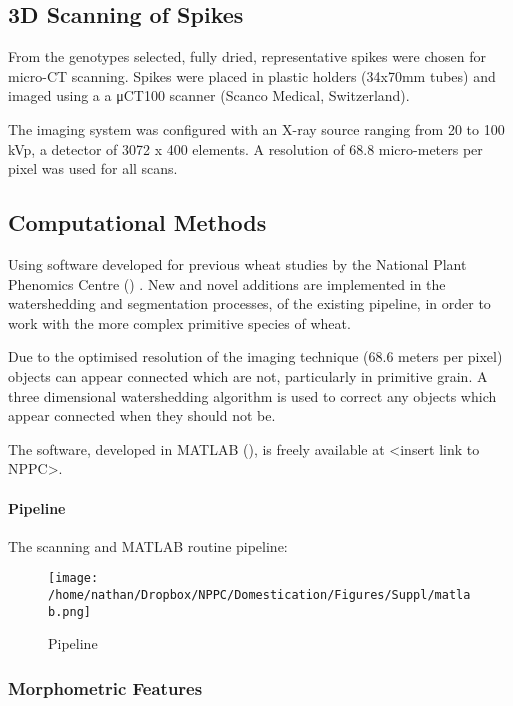 \documentclass[a4paper]{article}
\begin{document}
\subsection{3D Scanning of Spikes}
\label{sec:org3c0aa2e}

From the genotypes selected, fully dried,
representative spikes were chosen for micro-CT scanning.
Spikes were placed in plastic holders (34x70mm tubes) and imaged using a a μCT100 scanner (Scanco Medical, Switzerland).

The imaging system was configured with an X-ray source ranging from 20 to 100 kVp,
a detector of 3072 x 400 elements. A resolution of 68.8 micro-meters per pixel was used for all scans.


\subsection{Computational Methods}
\label{sec:org36dc96c}

Using software developed for previous wheat studies by the National Plant Phenomics Centre (\cite{Hughes2017}) . New and novel additions are implemented in the watershedding and segmentation processes, of the existing pipeline, in order to work with the more complex primitive species of wheat.

Due to the optimised resolution of the imaging technique (68.6\textmu{} meters per pixel) objects can appear connected which are not, particularly in primitive grain. A three dimensional watershedding algorithm is used to correct any objects which appear connected when they should not be.

The software, developed in MATLAB (\cite{MATHWORKS2017}), is freely available at <insert link to NPPC>.

\paragraph{Pipeline}
\label{sec:org3d92b5e}
The scanning and MATLAB routine pipeline:

\begin{figure}[htbp]
\centering
\texttt{[image: /home/nathan/Dropbox/NPPC/Domestication/Figures/Suppl/matlab.png]}
\caption{\label{fig:orgb4dd527}
Pipeline}
\end{figure}

\subsubsection{Morphometric Features}
\label{sec:orga16b3bd}
\end{document}
